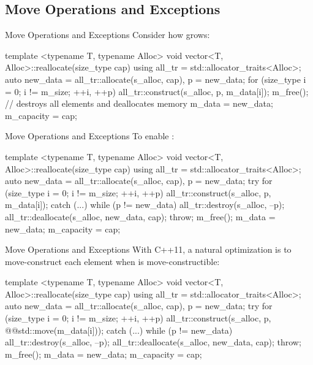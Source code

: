 \subsection{Move Operations and Exceptions}

\begin{frame}[fragile]{Move Operations and Exceptions}
  Consider how  grows:
  \begin{cpp}[\scriptsize]
template <typename T, typename Alloc>
void vector<T, Alloc>::reallocate(size_type cap) {
  using all_tr = std::allocator_traits<Alloc>;
  auto new_data = all_tr::allocate(s_alloc, cap), p = new_data;
  for (size_type i = 0; i != m_size; ++i, ++p)
    all_tr::construct(s_alloc, p, m_data[i]);
  m_free(); // destroys all elements and deallocates memory
  m_data = new_data;
  m_capacity = cap;
}
  \end{cpp}
\end{frame}

\begin{frame}[fragile]{Move Operations and Exceptions}
  To enable :
  \begin{cpp}[\scriptsize]
template <typename T, typename Alloc>
void vector<T, Alloc>::reallocate(size_type cap) {
  using all_tr = std::allocator_traits<Alloc>;
  auto new_data = all_tr::allocate(s_alloc, cap), p = new_data;
  try {
    for (size_type i = 0; i != m_size; ++i, ++p)
      all_tr::construct(s_alloc, p, m_data[i]);
  } catch (...) {
    while (p != new_data)
      all_tr::destroy(s_alloc, --p);
    all_tr::deallocate(s_alloc, new_data, cap);
    throw;
  }
  m_free();
  m_data = new_data;
  m_capacity = cap;
}
  \end{cpp}
\end{frame}

\begin{frame}[fragile]{Move Operations and Exceptions}
  With C++11, a natural optimization is to move-construct each element when  is move-constructible:
  \begin{cpp}[\scriptsize]
template <typename T, typename Alloc>
void vector<T, Alloc>::reallocate(size_type cap) {
  using all_tr = std::allocator_traits<Alloc>;
  auto new_data = all_tr::allocate(s_alloc, cap), p = new_data;
  try {
    for (size_type i = 0; i != m_size; ++i, ++p)
      all_tr::construct(s_alloc, p, @\scriptsizepinkbox[10em]@std::move(m_data[i]));
  } catch (...) {
    while (p != new_data)
      all_tr::destroy(s_alloc, --p);
    all_tr::deallocate(s_alloc, new_data, cap);
    throw;
  }
  m_free();
  m_data = new_data;
  m_capacity = cap;
}
  \end{cpp}
\end{frame}

